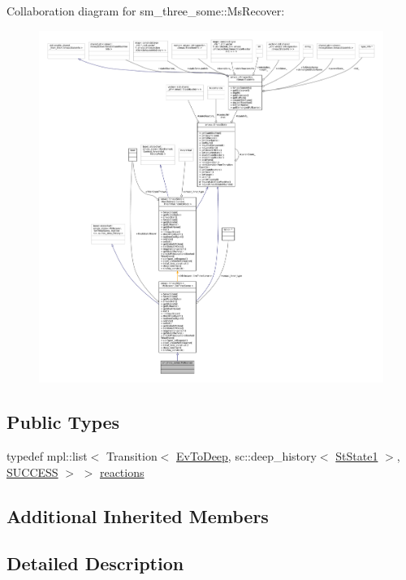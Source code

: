 Collaboration diagram for sm\+\_\+three\+\_\+some\+:\+:Ms\+Recover\+:
\nopagebreak
\begin{figure}[H]
\begin{center}
\leavevmode
\includegraphics[width=350pt]{classsm__three__some_1_1MsRecover__coll__graph}
\end{center}
\end{figure}
\subsection*{Public Types}
\begin{DoxyCompactItemize}
\item 
typedef mpl\+::list$<$ Transition$<$ \hyperlink{structsm__three__some_1_1EvToDeep}{Ev\+To\+Deep}, sc\+::deep\+\_\+history$<$ \hyperlink{structsm__three__some_1_1StState1}{St\+State1} $>$, \hyperlink{classSUCCESS}{S\+U\+C\+C\+E\+SS} $>$ $>$ \hyperlink{classsm__three__some_1_1MsRecover_aedc7f6fc4e95c1567e3262381b4bafce}{reactions}
\end{DoxyCompactItemize}
\subsection*{Additional Inherited Members}


\subsection{Detailed Description}


